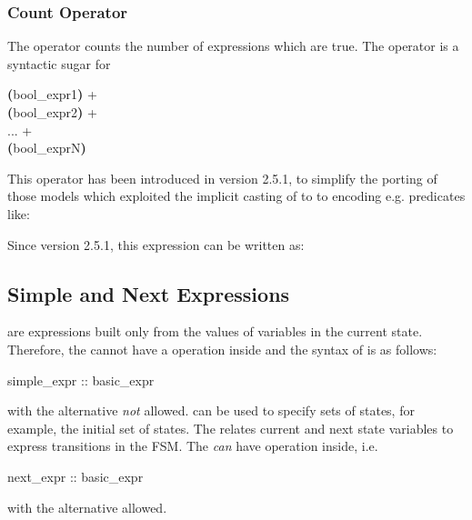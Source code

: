 \subsubsection{Count Operator}
\label{count operator}
The  operator counts the number of expressions
which are true.
%
The  operator is a syntactic sugar for
\begin{Grammar}
     \textbf{(}bool_expr1\textbf{)} +\\
     \textbf{(}bool_expr2\textbf{)} +\\
     ... +\\
     \textbf{(}bool_exprN\textbf{)}
\end{Grammar}
%
This operator has been introduced in version 2.5.1, to simplify
the porting of those models which exploited the implicit casting
of \Integer to \Boolean to encoding e.g. predicates like:

%
Since version 2.5.1, this expression can be written as:



\subsection{Simple and Next Expressions}
\label{Simple and Next Expressions}

 are expressions built only from the
values of variables in the current state.
%
Therefore, the  cannot have a
 operation inside and the syntax of
 is as follows:
%
\begin{Grammar}
simple_expr :: basic_expr
\end{Grammar}
%
with the alternative  \emph{not}
allowed.
%
 can be used to specify sets of states,
for example, the initial set of states.
%
The  relates current and next state
variables to express transitions in the FSM.
%
The  \emph{can} have 
operation inside, i.e.
%
\begin{Grammar}
next_expr :: basic_expr
\end{Grammar}
%
with the alternative  allowed.
%
%

